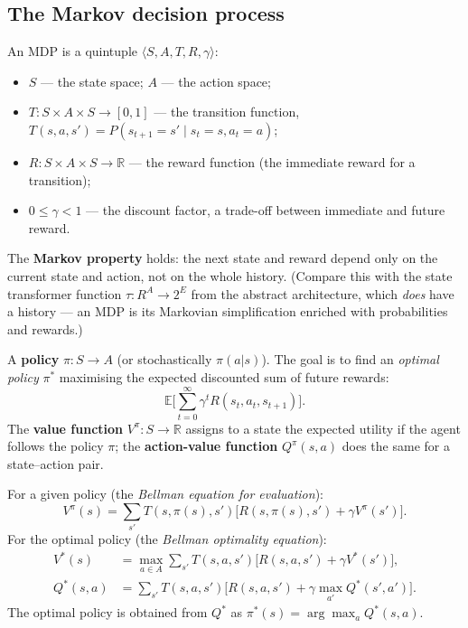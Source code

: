 \documentclass[11pt,a4paper]{article}
\theoremstyle{definition}
\begin{document}
\subsection{The Markov decision process}

\begin{defbox}
An MDP is a quintuple $\langle S, A, T, R, \gamma\rangle$:
\begin{itemize}
\item $S$ --- the state space; $A$ --- the action space;
\item $T : S \times A \times S \to [0,1]$ --- the transition function,
  $T(s,a,s') = P(s_{t+1}=s' \mid s_t=s, a_t=a)$;
\item $R : S \times A \times S \to \mathbb{R}$ --- the reward function (the immediate reward for a
  transition);
\item $0 \le \gamma < 1$ --- the discount factor, a trade-off between immediate and future reward.
\end{itemize}
The \textbf{Markov property} holds: the next state and reward depend only on the current state
and action, not on the whole history. (Compare this with the state transformer function
$\tau : R^A \to 2^E$ from the abstract architecture, which \emph{does} have a history --- an MDP is
its Markovian simplification enriched with probabilities and rewards.)

A \textbf{policy} $\pi : S \to A$ (or stochastically $\pi(a|s)$).
The goal is to find an \emph{optimal policy} $\pi^*$ maximising the expected discounted sum of
future rewards:
\[
\mathbb{E}\Big[ \sum_{t=0}^{\infty} \gamma^t R(s_t, a_t, s_{t+1}) \Big].
\]
The \textbf{value function} $V^\pi : S \to \mathbb{R}$ assigns to a state the expected utility
if the agent follows the policy $\pi$; the \textbf{action-value function}
$Q^\pi(s,a)$ does the same for a state--action pair.
\end{defbox}

\begin{defbox}
For a given policy (the \emph{Bellman equation for evaluation}):
\[
V^\pi(s) = \sum_{s'} T(s,\pi(s),s') \big[ R(s,\pi(s),s') + \gamma V^\pi(s') \big].
\]
For the optimal policy (the \emph{Bellman optimality equation}):
\begin{align*}
V^*(s) &= \max_{a \in A} \sum_{s'} T(s,a,s') \big[ R(s,a,s') + \gamma V^*(s')\big], \\
Q^*(s,a) &= \sum_{s'} T(s,a,s')\big[R(s,a,s') + \gamma \max_{a'} Q^*(s',a')\big].
\end{align*}
The optimal policy is obtained from $Q^*$ as $\pi^*(s) = \arg\max_a Q^*(s,a)$.
\end{defbox}
\end{document}
